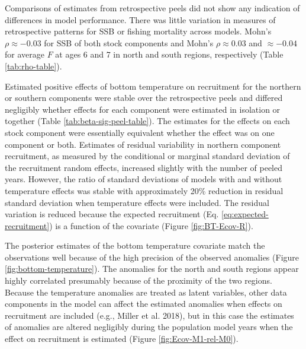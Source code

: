 \documentclass[
]{article}
\begin{document}
Comparisons of estimates from retrospective peels did not show any indication of differences in model performance. There was little variation in measures of retrospective patterns for SSB or fishing mortality across models. Mohn's \(\rho \approx -0.03\) for SSB of both stock components and Mohn's \(\rho \approx 0.03\) and \(\approx -0.04\) for average \(F\) at ages 6 and 7 in north and south regions, respectively (Table \ref{tab:rho-table}).

Estimated positive effects of bottom temperature on recruitment for the northern or southern components were stable over the retrospective peels and differed negligibly whether effects for each component were estimated in isolation or together (Table \ref{tab:beta-sig-peel-table}). The estimates for the effects on each stock component were essentially equivalent whether the effect was on one component or both. Estimates of residual variability in northern component recruitment, as measured by the conditional or marginal standard deviation of the recruitment random effects, increased slightly with the number of peeled years. However, the ratio of standard deviations of models with and without temperature effects was stable with approximately 20\% reduction in residual standard deviation when temperature effects were included. The residual variation is reduced because the expected recruitment (Eq. \ref{eq:expected-recruitment}) is a function of the covariate (Figure \ref{fig:BT-Ecov-R}).

The posterior estimates of the bottom temperature covariate match the observations well because of the high precision of the observed anomalies (Figure \ref{fig:bottom-temperature}). The anomalies for the north and south regions appear highly correlated presumably because of the proximity of the two regions. Because the temperature anomalies are treated as latent variables, other data components in the model can affect the estimated anomalies when effects on recruitment are included (e.g., Miller et al. 2018), but in this case the estimates of anomalies are altered negligibly during the population model years when the effect on recruitment is estimated (Figure \ref{fig:Ecov-M1-rel-M0}).
\end{document}
